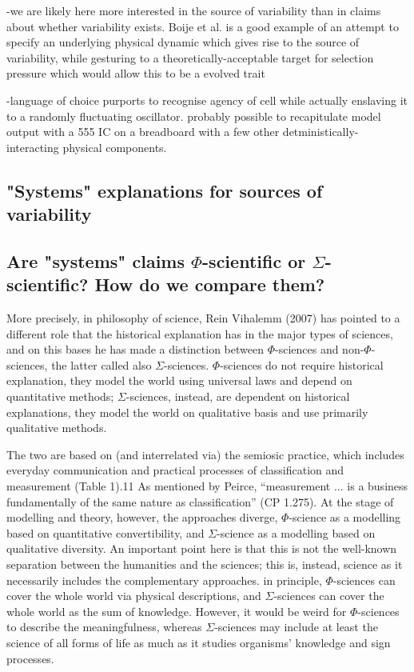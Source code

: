-we are likely here more interested in the source of variability than in claims about whether variability exists. Boije et al. \cite{Boije2015} is a good example of an attempt to specify an underlying physical dynamic which gives rise to the source of variability, while gesturing to a theoretically-acceptable target for selection pressure which would allow this to be a evolved trait

-language of choice purports to recognise agency of cell while actually enslaving it to a randomly fluctuating oscillator. probably possible to recapitulate model output with a 555 IC on a breadboard with a few other detministically-interacting physical components.


\subsection{"Systems" explanations for sources of variability}

\subsection{Are "systems" claims $\Phi$-scientific or $\Sigma$-scientific? How do we compare them?}

\begin{longquote}
More precisely, in philosophy of science, Rein Vihalemm (2007) has pointed to a
different role that the historical explanation has in the major types of sciences, and on
this bases he has made a distinction  between $\Phi$-sciences and non-$\Phi$-sciences, the latter  called also $\Sigma$-sciences. 
$\Phi$-sciences do not require historical explanation, they
model the world using universal laws  
and depend on quantitative methods; $\Sigma$-sciences, instead, are dependent on historical  explanations, they model the world on qualitative basis and use primarily qualitative methods. 

The two are based on (and interrelated via) the semiosic practice, which includes
everyday  communication  and  practical  processes  of  classification  and  measurement
(Table 1).11
 As mentioned by Peirce, “measurement ... is a business fundamentally of
the same nature as classification” (CP  1.275). At the stage of modelling and theory,
however, the approaches diverge, $\Phi$-science as a modelling based on quantitative
convertibility, and $\Sigma$-science as a modelling based on qualitative diversity.  An
important  point  here  is  that  this  is  not  the  well-known  separation  between  the
humanities  and  the  sciences;  this  is,  instead,  science  as  it  necessarily  includes  the
complementary  approaches. 
in  principle,  $\Phi$-sciences can cover the whole world via
physical  descriptions, and $\Sigma$-sciences  can  cover  the  whole  world  as  the  sum  of
knowledge.   However, it would   be   weird for $\Phi$-sciences to describe the meaningfulness,  whereas
$\Sigma$-sciences  may  include  at  least  the  science  of  all  forms  of
life as much as it studies organisms’ knowledge and sign processes. 
\end{longquote}\cite{Kull2009a}

